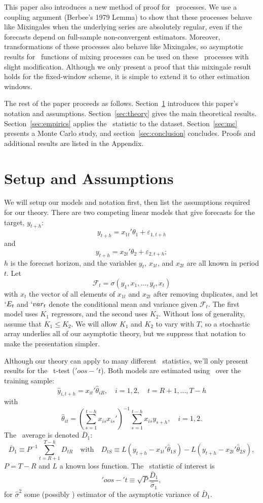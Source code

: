 \documentclass[11pt]{article}
\newcommand{\E}{`E}
\newcommand{\var}{`var}
\newcommand{\oost}{\ensuremath{'oos-'t}}
\newcommand{\oosSum}[2]{\ensuremath{\sum_{#1=R+#2}^{T-\h}}}
\newcommand{\h}{h}
\newcommand{\bh}[1]{\ensuremath{\hat\theta_{#1}}}
\begin{document}
This paper also introduces a new method of proof for \oos\ processes.
We use a coupling argument (Berbee's 1979 Lemma) to show that these
processes behave like Mixingales when the underlying series are
absolutely regular, even if the forecasts depend on full-sample
non-convergent estimators.  Moreover, transformations of these
processes also behave like Mixingales, so asymptotic results for \ned\
functions of mixing processes can be used on these \oos\ processes
with slight modification.  Although we only present a proof that this
mixingale result holds for the fixed-window scheme, it is simple to
extend it to other estimation windows.

The rest of the paper proceeds as follows.
Section~\ref{sec:assumptions} introduces this paper's notation and
assumptions.  Section~\ref{sec:theory} gives the main theoretical
results.  Section~\ref{sec:empirics} applies the \oos\ statistic to
the \citet{goyal-welch-2008-rfs} dataset.  Section~\ref{sec:mc}
presents a Monte Carlo study, and section~\ref{sec:conclusion}
concludes.  Proofs and additional results are listed in the Appendix.

\section{Setup and Assumptions}\label{sec:assumptions}
We will setup our models and notation first, then list the assumptions
required for our theory.  There are two competing linear models that
give forecasts for the target, $y_{t+\h}$:
\[
y_{t+\h} = x_{1t}'\theta_1 + \varepsilon_{1,t+h}
\]
and
\[
y_{t+\h} = x_{2t}'\theta_2 + \varepsilon_{2,t+h};
\]
$\h$ is the forecast horizon, and the variables $y_t$, $x_{1t}$, and
$x_{2t}$ are all known in period $t$.  Let
\begin{equation*}
  \mathcal{F}_t = \sigma(y_1, x_1, \dots, y_t, x_t)
\end{equation*}
with $x_t$ the vector of all elements of $x_{1t}$ and $x_{2t}$ after
removing duplicates, and let $\E_t$ and $\var_t$ denote the
conditional mean and variance given $\mathcal{F}_t$.  The first model
uses $K_1$ regressors, and the second uses $K_2$.  Without loss of
generality, assume that $K_1 \leq K_2$.  We will allow $K_1$ and $K_2$
to vary with $T$, so a stochastic array underlies all of our
asymptotic theory, but we suppress that notation to make the
presentation simpler.

Although our theory can apply to many different \oos\ statistics,
we'll only present results for the \oos\ t-test (\oost).  Both models
are estimated using \ols\ over the training sample:
\[
\hat y_{i,t+\h} = x_{it}'\bh{iR}, \quad i=1,2, \quad t = R+1,\dots,T-h
\]
with
\[
\bh{it} = (\sum_{s=1}^{t-\h} x_{is}x_{is}')^{-1} \sum_{s=1}^{t-\h} x_{is} y_{s+\h},
\quad i=1,2.
\]
The \oos\ average is denoted $\bar D_1$:
\[
\bar D_1 \equiv P^{-1} \oosSum{t}{1} D_{tR}
\quad \text{with} \quad D_{tS} \equiv L(y_{t+\h} - x_{1t}'\bh{1S}) -
L(y_{t+\h} - x_{2t}'\bh{2S}),
\]
$P = T - R$ and $L$ a known loss function.  The \oos\ statistic
of interest is
\[
\oost \equiv \sqrt{P} \frac{\bar D_1}{\hat\sigma_1},
\]
for $\hat\sigma^2$ some (possibly \hac) estimator of the asymptotic
variance of $\bar D_1$.
\end{document}
